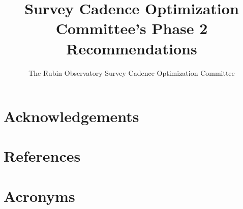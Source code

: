\documentclass[PST,authoryear,toc]{lsstdoc}
\title{Survey Cadence Optimization Committee’s Phase 2 Recommendations}
\author{%
The Rubin Observatory Survey Cadence Optimization Committee}
\date{\vcsDate}
\begin{document}
\maketitle




\appendix
\section{Acknowledgements}

\section{References} \label{sec:bib}
\renewcommand{\refname}{} %


\section{Acronyms} \label{sec:acronyms}

\end{document}
